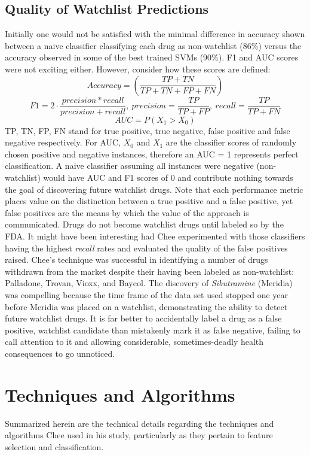 \documentclass[twoside,11pt]{article}
\begin{document}
\subsection{Quality of Watchlist Predictions}
Initially one would not be satisfied with the minimal difference in accuracy shown between a naive classifier classifying each drug as non-watchlist (86\%) versus the accuracy observed in some of the best trained SVMs (90\%). F1 and AUC scores were not exciting either. However, consider how these scores are defined:
\[
  Accuracy = \left(\frac{TP + TN}{TP + TN + FP + FN}\right)
\]
\[
  F1 = 2 \cdot \frac{precision * recall}{precision + recall}, \ precision = \frac{TP}{TP+FP},\ recall = \frac{TP}{TP+FN}
\]
\[
  AUC = P\left(X_{1} > X_{0}\right)
\]
TP, TN, FP, FN stand for true positive, true negative, false positive and false negative respectively. For AUC, $X_{0}$ and $X_{1}$ are the classifier scores of randomly chosen positive and negative instances, therefore an AUC = 1 represents perfect classification. A naive classifier assuming all instances were negative (non-watchlist) would have AUC and F1 scores of 0 and contribute nothing towards the goal of discovering future watchlist drugs. Note that each performance metric places value on the distinction between a true positive and a false positive, yet false positives are the means by which the value of the approach is communicated. Drugs do not become watchlist drugs until labeled so by the FDA. It might have been interesting had Chee experimented with those classifiers having the highest \textit{recall} rates and evaluated the quality of the false positives raised.
Chee's technique was successful in identifying a number of drugs withdrawn from the market despite their having been labeled as non-watchlist:  Palladone,  Trovan, Vioxx, and Baycol. The discovery of \textit{Sibutramine} (Meridia) was compelling because the time frame of the data set used stopped one year before Meridia was placed on a watchlist, demonstrating the ability to detect future watchlist drugs. It is far better to accidentally label a drug as a false positive, watchlist candidate than mistakenly mark it as false negative, failing to call attention to it and allowing considerable, sometimes-deadly health consequences to go unnoticed.

\section{Techniques and Algorithms}
Summarized herein are the technical details regarding the techniques and algorithms Chee used in his study, particularly as they pertain to feature selection and classification.
\end{document}
